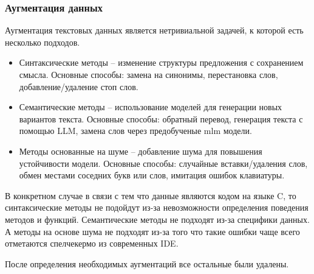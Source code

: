 \documentclass[../part_2.tex]{subfiles}
\begin{document}
    \subsubsection{Аугментация данных}
    \par Аугментация текстовых данных является нетривиальной задачей, к которой есть несколько подходов.
    \begin{itemize}
        \item Синтаксические методы -- изменение структуры предложения с сохранением смысла. Основные способы: замена на синонимы, перестановка слов, добавление/удаление стоп слов.
        \item Семантические методы -- использование моделей для генерации новых вариантов текста. Основные способы: обратный перевод, генерация текста с помощью LLM, замена слов через предобученые \acrshort{mlm} модели.
        \item Методы основанные на шуме -- добавление шума для повышения устойчивости модели. Основные способы: случайные вставки/удаления слов, обмен местами соседних букв или слов, имитация ошибок клавиатуры.
    \end{itemize}
    \par В конкретном случае в связи с тем что данные являются кодом на языке C, то синтаксические методы не подойдут из-за невозможности определения поведения методов и функций. Семантические методы не подходят из-за специфики данных. А методы на основе шума не подходят из-за того что такие ошибки чаще всего отметаются спелчекермо из современных IDE.
    \par После определения необходимых аугментаций все остальные были удалены.
\end{document}
